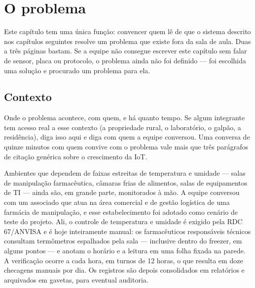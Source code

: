 \chapter{O problema}
\label{cap:problema}
\rubricaJustificativa

\begin{orientacao}
Este capítulo tem uma única função: convencer quem lê de que o sistema
descrito nos capítulos seguintes resolve um problema que existe fora da
sala de aula. Duas a três páginas bastam. Se a equipe não consegue
escrever este capítulo sem falar de sensor, placa ou protocolo, o
problema ainda não foi definido --- foi escolhida uma solução e
procurado um problema para ela.
\end{orientacao}

\section{Contexto}

\begin{orientacao}
Onde o problema acontece, com quem, e há quanto tempo. Se algum
integrante tem acesso real a esse contexto (a propriedade rural, o
laboratório, o galpão, a residência), diga isso aqui e diga com quem a
equipe conversou. Uma conversa de quinze minutos com quem convive com o
problema vale mais que três parágrafos de citação genérica sobre o
crescimento da IoT.
\end{orientacao}

Ambientes que dependem de faixas estreitas de temperatura e umidade ---
salas de manipulação farmacêutica, câmaras frias de alimentos, salas de
equipamentos de TI --- ainda são, em grande parte, monitorados à mão. A
equipe conversou com um associado que atua na área comercial e de
gestão logística de uma farmácia de manipulação, e esse estabelecimento
foi adotado como cenário de teste do projeto. Ali, o controle de
temperatura e umidade é exigido pela RDC 67/ANVISA e é hoje inteiramente
manual: os farmacêuticos responsáveis técnicos consultam termômetros
espalhados pela sala --- inclusive dentro do freezer, em alguns pontos
--- e anotam o horário e a leitura em uma folha fixada na parede. A
verificação ocorre a cada hora, em turnos de 12 horas, o que resulta em
doze checagens manuais por dia. Os registros são depois consolidados em
relatórios e arquivados em gavetas, para eventual auditoria.

